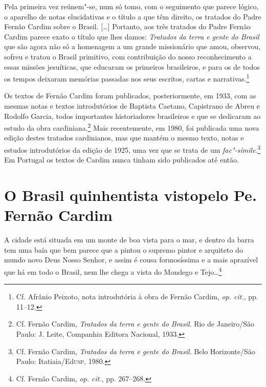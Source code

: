 \begin{hedraquote}
Pela primeira vez reúnem"-se, num só tomo, com o seguimento
que parece lógico, o aparelho de notas elucidativas e o título a que
têm direito, os tratados do Padre Fernão Cardim sobre o Brasil. [\ldots{}]
Portanto, aos três tratados do Padre Fernão Cardim parece exato o
título que lhes damos: \textit{Tratados da terra e gente do Brasil} 
que são agora não só a homenagem a um grande missionário que
amou, observou, sofreu e tratou o Brasil primitivo, com contribuição do
nosso reconhecimento a essas missões jesuíticas, que educaram os
primeiros brasileiros, e para os de todos os tempos deixaram memórias
passadas nos seus escritos, cartas e narrativas.\footnote{ Cf. Afrânio Peixoto, 
nota introdutória à obra de Fernão Cardim, \textit{op. cit.}, pp. 11--12.} 
\end{hedraquote}

 Os textos de Fernão Cardim foram publicados, posteriormente,
em 1933, com as mesmas notas e textos introdutórios de Baptista
Caetano, Capistrano de Abreu e Rodolfo Garcia, todos importantes
historiadores brasileiros e que se dedicaram ao estudo da obra
cardiniana.\footnote{ Cf. Fernão Cardim, \textit{Tratados da terra
e gente do Brasil}. Rio de Janeiro/São Paulo: J. Leite, Companhia
Editora Nacional, 1933.} Mais recentemente, em 1980, foi publicada uma nova
edição destes tratados cardinianos, mas que mantém o mesmo
texto, notas e estudos introdutórios da edição de 1925, uma vez que se
trata de um \textit{fac"-símile}.\footnote{ Cf. Fernão Cardim, \textit{Tratados
da terra e gente do Brasil}. Belo Horizonte/São Paulo: Itatiaia/Ed\textsc{usp}, 1980.} 
Em Portugal os textos de Cardim nunca tinham sido publicados até então.

\section*{O Brasil quinhentista visto\break pelo Pe. Fernão Cardim}

\begin{hedraquote}
A cidade está situada em um monte de boa vista para o mar,
e dentro da barra tem uma baía que bem parece que a pintou o supremo
pintor e arquiteto do mundo novo Deus Nosso Senhor, e assim é cousa
formosíssima e a mais aprazível que há em todo o Brasil, nem lhe chega
a vista do Mondego e Tejo\ldots{}\footnote{ Cf. Fernão Cardim,
\textit{op. cit.}, pp. 267--268.}
\end{hedraquote}
 
